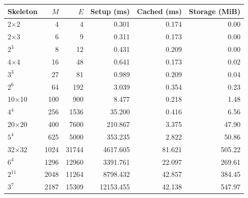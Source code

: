 \begin{tabular}{lrrrrr}
\toprule
Skeleton & $M$ & $E$ & Setup (ms) & Cached (ms) & Storage (MiB) \\
\midrule
2$\times$2 & 4 & 4 & 0.301 & 0.174 & 0.00 \\
2$\times$3 & 6 & 9 & 0.311 & 0.173 & 0.00 \\
$2^{3}$ & 8 & 12 & 0.431 & 0.209 & 0.00 \\
4$\times$4 & 16 & 48 & 0.641 & 0.173 & 0.02 \\
$3^{3}$ & 27 & 81 & 0.989 & 0.209 & 0.04 \\
$2^{6}$ & 64 & 192 & 3.039 & 0.354 & 0.23 \\
10$\times$10 & 100 & 900 & 8.477 & 0.218 & 1.48 \\
$4^{4}$ & 256 & 1536 & 35.200 & 0.416 & 6.56 \\
20$\times$20 & 400 & 7600 & 210.867 & 3.375 & 47.90 \\
$5^{4}$ & 625 & 5000 & 353.235 & 2.822 & 50.86 \\
32$\times$32 & 1024 & 31744 & 4617.605 & 81.621 & 505.22 \\
$6^{4}$ & 1296 & 12960 & 3391.761 & 22.097 & 269.61 \\
$2^{11}$ & 2048 & 11264 & 8798.432 & 42.857 & 384.45 \\
$3^{7}$ & 2187 & 15309 & 12153.455 & 42.138 & 547.97 \\
\bottomrule
\end{tabular}
